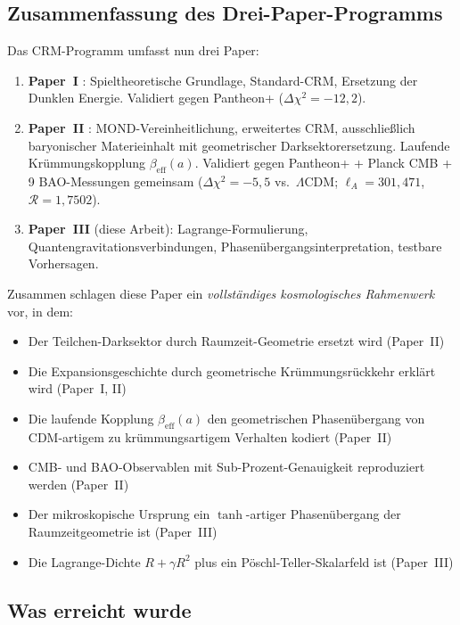 \documentclass[11pt,a4paper]{article}
\begin{document}
\subsection{Zusammenfassung des Drei-Paper-Programms}

Das CRM-Programm umfasst nun drei Paper:
\begin{enumerate}
\item \textbf{Paper~I} \cite{Geiger2026}: Spieltheoretische Grundlage, Standard-CRM, Ersetzung der Dunklen Energie. Validiert gegen Pantheon+ ($\Delta\chi^2 = -12{,}2$).
\item \textbf{Paper~II} \cite{Geiger2026b}: MOND-Vereinheitlichung, erweitertes CRM, ausschlie\ss lich baryonischer Materieinhalt mit geometrischer Darksektorersetzung. Laufende Kr\"ummungskopplung $\beta_{\mathrm{eff}}(a)$. Validiert gegen Pantheon+ + Planck CMB + 9 BAO-Messungen gemeinsam ($\Delta\chi^2 = -5{,}5$ vs.\ $\Lambda$CDM; $\ell_A = 301{,}471$, $\mathcal{R} = 1{,}7502$).
\item \textbf{Paper~III} (diese Arbeit): Lagrange-Formulierung, Quantengravitationsverbindungen, Phasen\"ubergangsinterpretation, testbare Vorhersagen.
\end{enumerate}

Zusammen schlagen diese Paper ein \textit{vollst\"andiges kosmologisches Rahmenwerk} vor, in dem:
\begin{itemize}
\item Der Teilchen-Darksektor durch Raumzeit-Geometrie ersetzt wird (Paper~II)
\item Die Expansionsgeschichte durch geometrische Kr\"ummungsr\"uckkehr erkl\"art wird (Paper~I, II)
\item Die laufende Kopplung $\beta_{\mathrm{eff}}(a)$ den geometrischen Phasen\"ubergang von CDM-artigem zu kr\"ummungsartigem Verhalten kodiert (Paper~II)
\item CMB- und BAO-Observablen mit Sub-Prozent-Genauigkeit reproduziert werden (Paper~II)
\item Der mikroskopische Ursprung ein $\tanh$-artiger Phasen\"ubergang der Raumzeitgeometrie ist (Paper~III)
\item Die Lagrange-Dichte $R + \gamma R^2$ plus ein P\"oschl-Teller-Skalarfeld ist (Paper~III)
\end{itemize}

\subsection{Was erreicht wurde}
\end{document}
